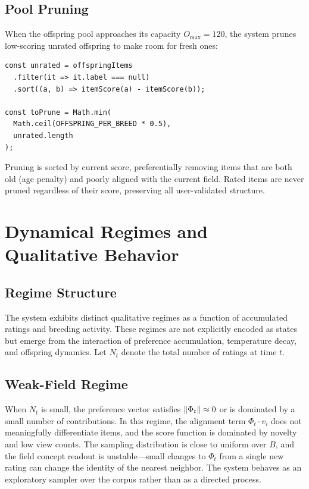 \documentclass[12pt, a4paper]{article}
\DeclarePairedDelimiter{\norm}{\lVert}{\rVert}
\theoremstyle{definition}
\begin{document}
\subsection{Pool Pruning}

When the offspring pool approaches its capacity $O_{\max} = 120$, the system prunes low-scoring unrated offspring to make room for fresh ones:

\begin{lstlisting}[language={}, caption={Pruning on breed}]
const unrated = offspringItems
  .filter(it => it.label === null)
  .sort((a, b) => itemScore(a) - itemScore(b));

const toPrune = Math.min(
  Math.ceil(OFFSPRING_PER_BREED * 0.5),
  unrated.length
);
\end{lstlisting}

Pruning is sorted by current score, preferentially removing items that are both old (age penalty) and poorly aligned with the current field. Rated items are never pruned regardless of their score, preserving all user-validated structure.

\section{Dynamical Regimes and Qualitative Behavior}

\subsection{Regime Structure}

The system exhibits distinct qualitative regimes as a function of accumulated ratings and breeding activity. These regimes are not explicitly encoded as states but emerge from the interaction of preference accumulation, temperature decay, and offspring dynamics. Let $N_t$ denote the total number of ratings at time $t$.

\subsection{Weak-Field Regime}

When $N_t$ is small, the preference vector satisfies $\norm{\Phi_t} \approx 0$ or is dominated by a small number of contributions. In this regime, the alignment term $\Phi_t \cdot v_i$ does not meaningfully differentiate items, and the score function is dominated by novelty and low view counts. The sampling distribution is close to uniform over $B$, and the field concept readout is unstable---small changes to $\Phi_t$ from a single new rating can change the identity of the nearest neighbor. The system behaves as an exploratory sampler over the corpus rather than as a directed process.
\end{document}
